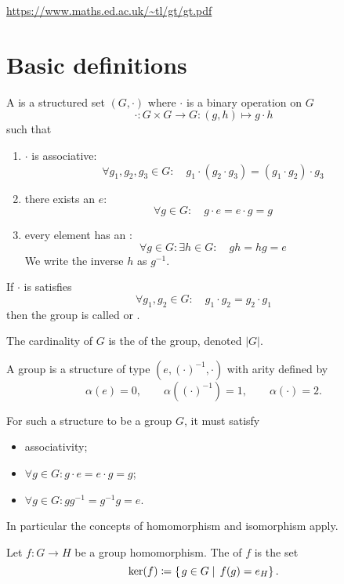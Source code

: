 \url{https://www.maths.ed.ac.uk/~tl/gt/gt.pdf}

\section{Basic definitions}

\begin{definition}
A  is a structured set $(G,\boldsymbol{\cdot})$ where $\boldsymbol{\cdot}$ is a binary operation on $G$
\[\boldsymbol{\cdot}: G\times G \to G: (g,h)\mapsto g\cdot h\]
such that
\begin{enumerate}
\item $\boldsymbol{\cdot}$ is associative:
\[ \forall g_1,g_2,g_3 \in G: \quad g_1\cdot (g_2\cdot g_3) = (g_1\cdot g_2)\cdot g_3 \]
\item there exists an  $e$:
\[ \forall g\in G: \quad g\cdot e = e\cdot g = g \]
\item every element has an :
\[ \forall g\in G: \exists h \in G: \quad  gh = hg = e \]
We write the inverse $h$ as $g^{-1}$. 
\end{enumerate}
If $\boldsymbol{\cdot}$ is satisfies
\[ \forall g_1, g_2 \in G: \quad g_1 \cdot g_2 = g_2\cdot g_1 \]
then the group is called  or .

The cardinality of $G$ is the  of the group, denoted $|G|$.
\end{definition}

\begin{lemma}
A group is a structure of type $(e, (\cdot)^{-1}, \boldsymbol{\cdot})$ with arity defined by
\[ \alpha(e) = 0, \qquad \alpha((\cdot)^{-1}) = 1, \qquad \alpha(\boldsymbol{\cdot}) = 2. \]
\end{lemma}
For such a structure to be a group $G$, it must satisfy
\begin{itemize}
\item associativity;
\item $\forall g\in G: g\cdot e = e\cdot g = g$;
\item $\forall g\in G: gg^{-1} = g^{-1}g = e$.
\end{itemize}
In particular the concepts of homomorphism and isomorphism apply.

\begin{definition}
Let $f:G\to H$ be a group homomorphism. The  of $f$ is the set
\[ \ker(f) \coloneqq \left\{\left. g\in G \;\right|\; f(g)=e_H \right\}. \]
\end{definition}

